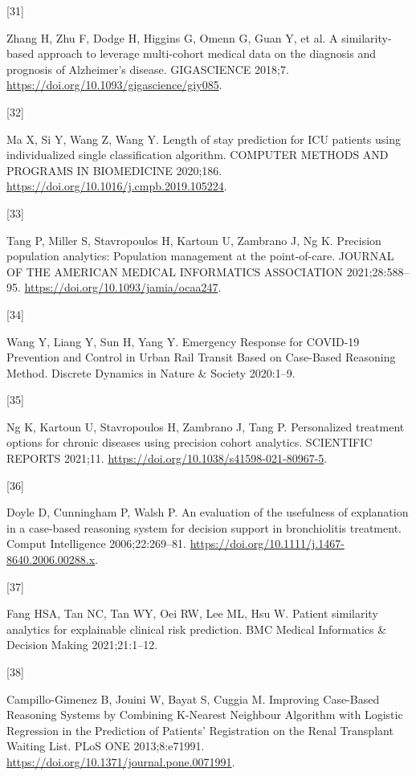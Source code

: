 \documentclass[preprint, 3p,
authoryear]{elsarticle} %
\newlength{\cslhangindent}
\newlength{\csllabelwidth}
\newlength{\cslentryspacingunit} %
\newenvironment{CSLReferences}[2] %
 {%
  \setlength{\parindent}{0pt}
  \ifodd #1
  \let\oldpar\par
  \def\par{\hangindent=\cslhangindent\oldpar}
  \fi
  \setlength{\parskip}{#2\cslentryspacingunit}
 }%
 {}
\newcommand{\CSLLeftMargin}[1]{\parbox[t]{\csllabelwidth}{#1}}
\newcommand{\CSLRightInline}[1]{\parbox[t]{\linewidth - \csllabelwidth}{#1}\break}
\begin{document}
\begin{CSLReferences}{0}{0}
\leavevmode{}%
\CSLLeftMargin{{[}31{]} }%
\CSLRightInline{Zhang H, Zhu F, Dodge H, Higgins G, Omenn G, Guan Y, et
al. A similarity-based approach to leverage multi-cohort medical data on
the diagnosis and prognosis of {Alzheimer}'s disease. GIGASCIENCE
2018;7. \url{https://doi.org/10.1093/gigascience/giy085}.}

\leavevmode{}%
\CSLLeftMargin{{[}32{]} }%
\CSLRightInline{Ma X, Si Y, Wang Z, Wang Y. Length of stay prediction
for {ICU} patients using individualized single classification algorithm.
COMPUTER METHODS AND PROGRAMS IN BIOMEDICINE 2020;186.
\url{https://doi.org/10.1016/j.cmpb.2019.105224}.}

\leavevmode{}%
\CSLLeftMargin{{[}33{]} }%
\CSLRightInline{Tang P, Miller S, Stavropoulos H, Kartoun U, Zambrano J,
Ng K. Precision population analytics: Population management at the
point-of-care. JOURNAL OF THE AMERICAN MEDICAL INFORMATICS ASSOCIATION
2021;28:588--95. \url{https://doi.org/10.1093/jamia/ocaa247}.}

\leavevmode{}%
\CSLLeftMargin{{[}34{]} }%
\CSLRightInline{Wang Y, Liang Y, Sun H, Yang Y. Emergency {Response} for
{COVID-19 Prevention} and {Control} in {Urban Rail Transit Based} on
{Case-Based Reasoning Method}. Discrete Dynamics in Nature \& Society
2020:1--9.}

\leavevmode{}%
\CSLLeftMargin{{[}35{]} }%
\CSLRightInline{Ng K, Kartoun U, Stavropoulos H, Zambrano J, Tang P.
Personalized treatment options for chronic diseases using precision
cohort analytics. SCIENTIFIC REPORTS 2021;11.
\url{https://doi.org/10.1038/s41598-021-80967-5}.}

\leavevmode{}%
\CSLLeftMargin{{[}36{]} }%
\CSLRightInline{Doyle D, Cunningham P, Walsh P. An evaluation of the
usefulness of explanation in a case-based reasoning system for decision
support in bronchiolitis treatment. Comput Intelligence 2006;22:269--81.
\url{https://doi.org/10.1111/j.1467-8640.2006.00288.x}.}

\leavevmode{}%
\CSLLeftMargin{{[}37{]} }%
\CSLRightInline{Fang HSA, Tan NC, Tan WY, Oei RW, Lee ML, Hsu W. Patient
similarity analytics for explainable clinical risk prediction. BMC
Medical Informatics \& Decision Making 2021;21:1--12.}

\leavevmode{}%
\CSLLeftMargin{{[}38{]} }%
\CSLRightInline{Campillo-Gimenez B, Jouini W, Bayat S, Cuggia M.
Improving {Case-Based Reasoning Systems} by {Combining K-Nearest
Neighbour Algorithm} with {Logistic Regression} in the {Prediction} of
{Patients}' {Registration} on the {Renal Transplant Waiting List}. PLoS
ONE 2013;8:e71991. \url{https://doi.org/10.1371/journal.pone.0071991}.}


\end{CSLReferences}
\end{document}
